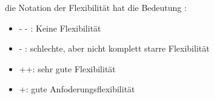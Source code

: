 \documentclass[enabledeprecatedfontcommands,fontsize=12pt,paper=a4,twoside]{scrartcl}
\begin{document}



die Notation der Flexibilität hat die  Bedeutung :
\begin{itemize}
    \item - - : Keine Flexibilität
    \item - : schlechte, aber nicht komplett starre Flexibilität
    \item ++: sehr gute Flexibilität
    \item +: gute Anfoderungsflexibilität
     
  \end{itemize} 
\end{document}
